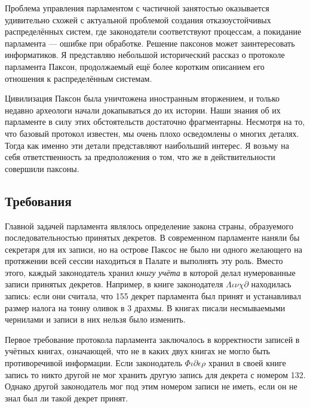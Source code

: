 \documentclass[12pt, a4paper]{article} %
\begin{document}
Проблема управления парламентом с частичной занятостью оказывается удивительно схожей с актуальной проблемой создания отказоустойчивых распределённых систем, где законодатели соответствуют процессам, а покидание парламента --- ошибке при обработке. Решение паксонов может заинтересовать информатиков. Я представляю небольшой исторический рассказ о протоколе парламента Паксон, продолжаемый ещё более коротким описанием его отношения к распределённым системам.

Цивилизация Паксон была уничтожена иностранным вторжением, и только недавно археологи начали докапываться до их истории. Наши знания об их парламенте в силу этих обстоятельств достаточно фрагментарны. Несмотря на то, что базовый протокол известен, мы очень плохо осведомлены о многих деталях. Тогда как именно эти детали представляют наибольший интерес. Я возьму на себя ответственность за предположения о том, что же в действительности совершили паксоны.

\subsection{Требования}

Главной задачей парламента являлось определение закона страны, образуемого последовательностью принятых декретов. В современном парламенте наняли бы секретаря для их записи, но на острове Паксос не было ни одного желающего на протяжении всей сессии находиться в Палате и выполнять эту роль. Вместо этого, каждый законодатель хранил \textit{книгу учёта} в которой делал нумерованные записи принятых декретов. Например, в книге законодателя $\Lambda\iota\nu\chi\partial$ находилась запись:
если они считала, что 155 декрет парламента был принят и устанавливал размер налога на тонну оливок в 3 драхмы. В книгах писали несмываемыми чернилами и записи в них нельзя было изменить.

Первое требование протокола парламента заключалось в корректности записей в учётных книгах, означающей, что не в каких двух книгах не могло быть противоречивой информации. Если законодатель $\Phi\iota\partial\epsilon\rho$ хранил в своей книге запись 
то никто другой не мог хранить другую запись для декрета с номером 132. Однако другой законодатель мог под этим номером записи не иметь, если он не знал был ли такой декрет принят.
\end{document}
